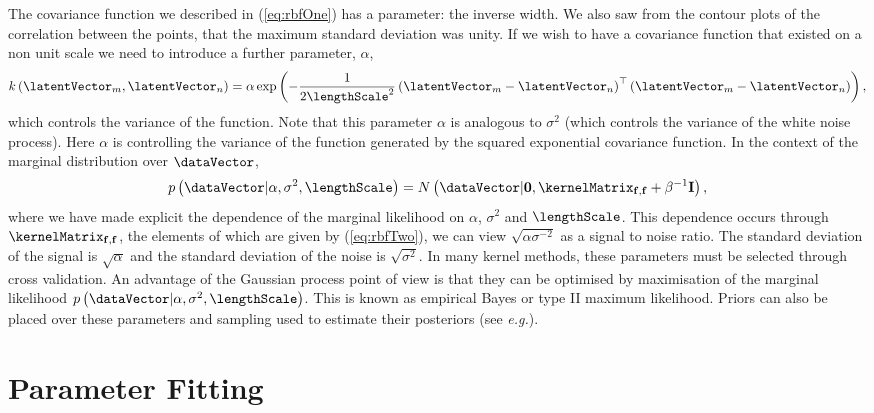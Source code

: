 The covariance function we described in (\ref{eq:rbfOne}) has a
parameter: the inverse width. We also saw from the contour plots of
the correlation between the points, that the maximum standard
deviation was unity.  If we wish to have a covariance function that
existed on a non unit scale we need to introduce a further parameter,
$\alpha$,
\begin{equation}
  k\left(\latentVector_{m},\latentVector_{n}\right)=\alpha\exp\left(-\frac{1}{2\lengthScale^2}\left(\latentVector_{m}-\latentVector_{n}\right)^{\top}\left(\latentVector_{m}-\latentVector_{n}\right)\right),\label{eq:rbfTwo}
\end{equation}
which controls the variance of the function. Note that this parameter
$\alpha$ is analogous to $\sigma^2$ (which controls the variance of
the white noise process). Here $\alpha$ is controlling the variance of
the function generated by the squared exponential covariance function. In the context of the
marginal distribution over $\dataVector$,
\begin{equation}
  p\left(\dataVector|\alpha,\sigma^2,\lengthScale\right)=N\left(\dataVector|\mathbf{0},\kernelMatrix_{\mathbf{f},\mathbf{f}}+\mathbf{\beta}^{-1}\mathbf{I}\right),\label{eq:gpMarginal2}
\end{equation}
where we have made explicit the dependence of the marginal likelihood
on $\alpha$, $\sigma^2$ and $\lengthScale$. This dependence occurs through
$\kernelMatrix_{\mathbf{f},\mathbf{f}}$, the elements of which are given
by (\ref{eq:rbfTwo}), we can view $\sqrt{\alpha\sigma^{-2}}$ as a
signal to noise ratio. The standard deviation of the signal is
$\sqrt{\alpha}$ and the standard deviation of the noise is
$\sqrt{\sigma^2}$. In many kernel methods, these parameters must be
selected through cross validation. An advantage of the Gaussian
process point of view is that they can be optimised by maximisation of
the marginal likelihood
$p\left(\dataVector|\alpha,\sigma^2,\lengthScale\right)$. This is known as
empirical Bayes or type II maximum likelihood. Priors can also be
placed over these parameters and sampling used to estimate their
posteriors (see \emph{e.g.}\citealt{Williams:Gaussian96}).


\section{Parameter Fitting}

